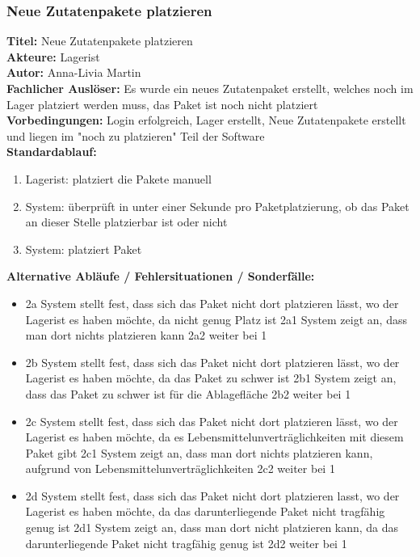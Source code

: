 \subsubsection{Neue Zutatenpakete platzieren}
\textbf{Titel:} Neue Zutatenpakete platzieren\\
\textbf{Akteure:} Lagerist\\
\textbf{Autor:} Anna-Livia Martin\\
\textbf{Fachlicher Auslöser:} Es wurde ein neues Zutatenpaket erstellt, welches noch im Lager platziert werden muss, das Paket ist noch nicht platziert\\
\textbf{Vorbedingungen:} Login erfolgreich, Lager erstellt, Neue Zutatenpakete erstellt und liegen im "noch zu platzieren" Teil der Software\\
\textbf{Standardablauf:}
\begin{enumerate}
    \item Lagerist: platziert die Pakete manuell\\
    \item System: überprüft in unter einer Sekunde pro Paketplatzierung, ob das Paket an dieser Stelle platzierbar ist oder nicht\\
	\item System: platziert Paket\\
\end{enumerate}
\textbf{Alternative Abläufe / Fehlersituationen / Sonderfälle:}
\begin{itemize}
	\item 2a System stellt fest, dass sich das Paket nicht dort platzieren lässt, wo der Lagerist es haben möchte, da nicht genug Platz ist
		\subitem 2a1 System zeigt an, dass man dort nichts platzieren kann
		\subitem 2a2 weiter bei 1
	\item 2b System stellt fest, dass sich das Paket nicht dort platzieren lässt, wo der Lagerist es haben möchte, da das Paket zu schwer ist
		\subitem 2b1 System zeigt an, dass das Paket zu schwer ist für die Ablagefläche
		\subitem 2b2 weiter bei 1
	\item 2c System stellt fest, dass sich das Paket nicht dort platzieren lässt, wo der Lagerist es haben möchte, da es Lebensmittelunverträglichkeiten mit diesem Paket gibt
		\subitem 2c1 System zeigt an, dass man dort nichts platzieren kann, aufgrund von Lebensmittelunverträglichkeiten
		\subitem 2c2 weiter bei 1
	\item 2d System stellt fest, dass sich das Paket nicht dort platzieren lasst, wo der Lagerist es haben möchte, da das darunterliegende Paket nicht tragfähig genug ist
		\subitem 2d1 System zeigt an, dass man dort nicht platzieren kann, da das darunterliegende Paket nicht tragfähig genug ist
		\subitem 2d2 weiter bei 1\\
\end{itemize}
